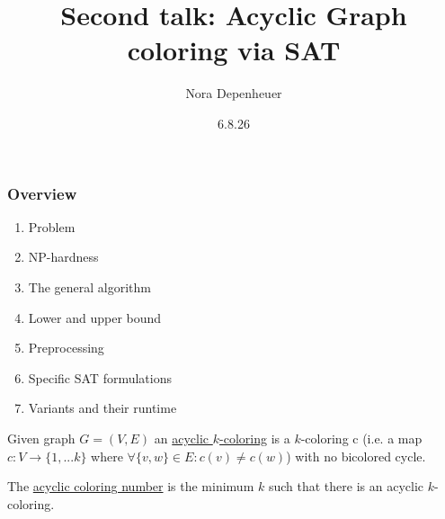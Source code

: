 \documentclass{beamer}
\title{Second talk: Acyclic Graph coloring via SAT}
\author{Nora Depenheuer}
\date{6.8.26}
\begin{document}
	\begin{frame}
		\titlepage
	\end{frame}
	\begin{frame}
		\frametitle{Overview}
		\begin{enumerate}
			\item Problem
			\item NP-hardness
			\item The general algorithm
			\item Lower and upper bound
			\item Preprocessing
			\item Specific SAT formulations
			\item Variants and their runtime
		\end{enumerate}
	\end{frame}
	\begin{frame}
		\begin{definition}
			Given graph $G=(V,E)$ an \underline{acyclic $k$-coloring} is a $k$-coloring c (i.e. a map $c:V\to \{1,...k\}$ where $\forall \{v,w\}\in E: c(v)\neq c(w)$) with no bicolored cycle.
		\end{definition}
		\begin{definition}
			The \underline{acyclic coloring number} is the minimum $k$ such that there is an acyclic $k$-coloring.
		\end{definition}
	\end{frame}
\end{document}

